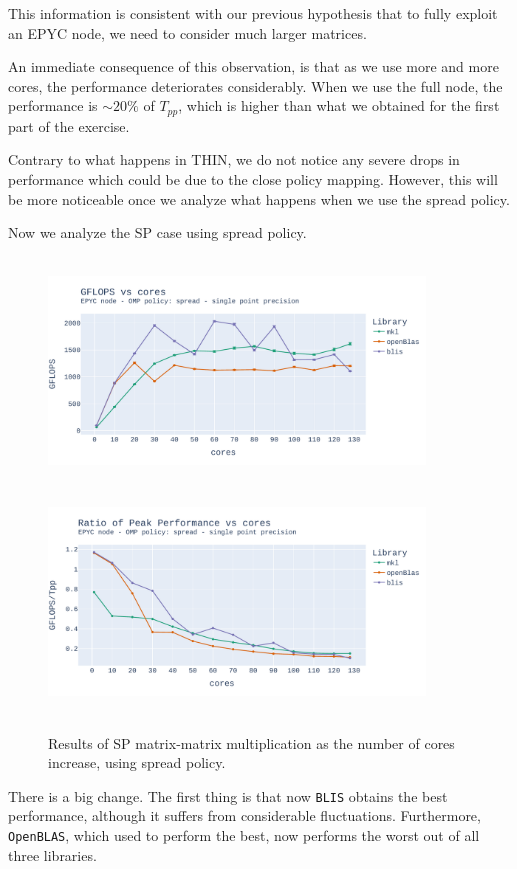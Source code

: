 \documentclass{report}
\begin{document}
This information is consistent with our previous hypothesis that to fully exploit 
an EPYC node, we need to consider much larger matrices. 

An immediate consequence of this observation, is that as we use more and more cores, 
the performance deteriorates considerably. When we use the full node, the 
performance is $\sim20\%$ of $T_{pp}$, which is higher than what we obtained for 
the first part of the exercise.

Contrary to what happens in THIN, we do not notice any severe drops in performance 
which could be due to the close policy mapping. However, this will be more 
noticeable once we analyze what happens when we use the spread policy.

Now we analyze the SP case using spread policy.

\begin{figure}[H]
\hspace*{-2.5cm}
\includegraphics[width=10cm, height=6cm]{./images/fixed_size_epyc_float_gflops_spread.pdf}
\includegraphics[width=10cm, height=6cm]{./images/fixed_size_epyc_float_gflops_spread_ratio.pdf}
\caption{\label{fig:fixed_size_epyc_float_spread} Results of SP matrix-matrix multiplication 
as the number of cores increase, using spread policy.}
\end{figure}

There is a big change. The first thing is that now \texttt{BLIS} obtains the best 
performance, although it suffers from considerable fluctuations. Furthermore, 
\texttt{OpenBLAS}, which used to perform the best, now performs the worst out of 
all three libraries.
\end{document}
